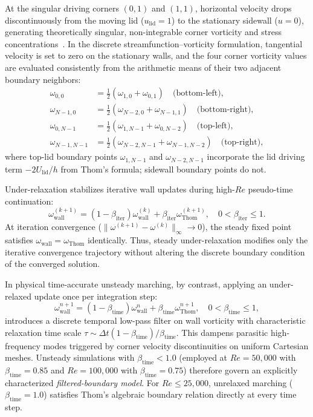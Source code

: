 \documentclass[11pt,a4paper]{article}
\begin{document}
At the singular driving corners $(0, 1)$ and $(1, 1)$, horizontal velocity drops discontinuously from the moving lid ($u_{\text{lid}} = 1$) to the stationary sidewall ($u = 0$), generating theoretically singular, non-integrable corner vorticity and stress concentrations~\cite{botella1998benchmark,bruneau20062d}. In the discrete streamfunction--vorticity formulation, tangential velocity is set to zero on the stationary walls, and the four corner vorticity values are evaluated consistently from the arithmetic means of their two adjacent boundary neighbors:
\begin{align}
    \omega_{0, 0} &= \frac{1}{2}(\omega_{1, 0} + \omega_{0, 1}) \quad \text{(bottom-left)}, \\
    \omega_{N-1, 0} &= \frac{1}{2}(\omega_{N-2, 0} + \omega_{N-1, 1}) \quad \text{(bottom-right)}, \\
    \omega_{0, N-1} &= \frac{1}{2}(\omega_{1, N-1} + \omega_{0, N-2}) \quad \text{(top-left)}, \\
    \omega_{N-1, N-1} &= \frac{1}{2}(\omega_{N-2, N-1} + \omega_{N-1, N-2}) \quad \text{(top-right)},
\end{align}
where top-lid boundary points $\omega_{1, N-1}$ and $\omega_{N-2, N-1}$ incorporate the lid driving term $-2 U_{\text{lid}} / h$ from Thom's formula; sidewall boundary points do not.

Under-relaxation stabilizes iterative wall updates during high-$Re$ pseudo-time continuation:
\begin{equation}
    \omega_{\text{wall}}^{(k+1)} = (1 - \beta_{\text{iter}}) \omega_{\text{wall}}^{(k)} + \beta_{\text{iter}} \omega_{\text{Thom}}^{(k+1)}, \quad 0 < \beta_{\text{iter}} \le 1.
\end{equation}
At iteration convergence ($\|\omega^{(k+1)} - \omega^{(k)}\|_\infty \to 0$), the steady fixed point satisfies $\omega_{\text{wall}} = \omega_{\text{Thom}}$ identically. Thus, steady under-relaxation modifies only the iterative convergence trajectory without altering the discrete boundary condition of the converged solution.

In physical time-accurate unsteady marching, by contrast, applying an under-relaxed update once per integration step:
\begin{equation}
    \omega_{\text{wall}}^{n+1} = (1 - \beta_{\text{time}}) \omega_{\text{wall}}^n + \beta_{\text{time}} \omega_{\text{Thom}}^{n+1}, \quad 0 < \beta_{\text{time}} \le 1,
\end{equation}
introduces a discrete temporal low-pass filter on wall vorticity with characteristic relaxation time scale $\tau \sim \Delta t (1 - \beta_{\text{time}}) / \beta_{\text{time}}$. This dampens parasitic high-frequency modes triggered by corner velocity discontinuities on uniform Cartesian meshes. Unsteady simulations with $\beta_{\text{time}} < 1.0$ (employed at $Re = 50{,}000$ with $\beta_{\text{time}} = 0.85$ and $Re = 100{,}000$ with $\beta_{\text{time}} = 0.75$) therefore govern an explicitly characterized \emph{filtered-boundary model}. For $Re \le 25{,}000$, unrelaxed marching ($\beta_{\text{time}} = 1.0$) satisfies Thom's algebraic boundary relation directly at every time step.
\end{document}
